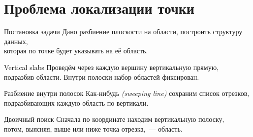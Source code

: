 \section{Проблема локализации точки}

\begin{frame}{Постановка задачи}
	Дано разбиение плоскости на области, построить структуру данных, \\
	которая по точке будет указывать на её область.
	\vspace{-1mm}

  \begin{center}  \end{center}
\end{frame}


\begin{frame}{Vertical slabs}
	Проведём через каждую вершину вертикальную прямую, \\
	подразбив области. Внутри полоски набор областей фиксирован.
	\vspace{-1mm}

  \begin{center}  \end{center}
\end{frame}


\begin{frame}{Разбиение внутри полосок}
	Как-нибудь {\it (sweeping line)} сохраним список отрезков, \\
	подразбивающих каждую область по вертикали.
	\vspace{-1mm}

  \begin{center}  \end{center}
\end{frame}


\begin{frame}{Двоичный поиск}
	Сначала по координате находим вертикальную полоску, \\
	потом, выясняя, выше или ниже точка отрезка,~— область.
	\vspace{-1mm}

  \begin{center}  \end{center}
\end{frame}


